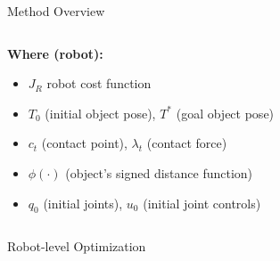 \documentclass[10pt, aspectratio=169]{beamer}
\begin{document}
\begin{frame}{Method Overview}
\begin{columns}[T,onlytextwidth]
\begin{column}{0.5\textwidth}
        \medskip
        \textbf{Where (robot):}
        \begin{itemize}\itemsep0.1em
            \item $J_{R}$ robot cost function
            \item $T_0$ (initial object pose), $T^*$ (goal object pose)
            \item $c_t$ (contact point), $\lambda_t$ (contact force)
            \item $\phi(\cdot)$  (object's signed distance function)
            \item $q_0$ (initial joints), $u_0$ (initial joint controls)
        \end{itemize}
    \end{column}
\end{columns}
\end{frame}

\begin{frame}[plain]
  \centering
  \Huge Robot-level Optimization
\end{frame}
\end{document}
